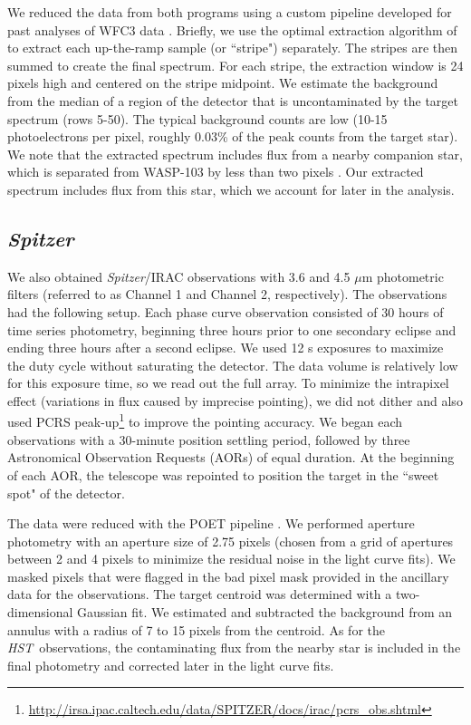 \documentclass[twocolumn]{aastex61}
\newcommand{\project}[1]{\textsl{#1}}
\newcommand{\HST}{\project{HST}}
\newcommand{\Spitzer}{\project{Spitzer}}
\begin{document}
We reduced the data from both programs using a custom pipeline developed for past analyses of WFC3 data \citep[for details see][]{kreidberg14a, kreidberg14b, kreidberg15b}. Briefly, we use the optimal extraction algorithm of \cite{horne86} to extract each up-the-ramp sample (or ``stripe") separately. The stripes are then summed to create the final spectrum. For each stripe, the extraction window is 24 pixels high and centered on the stripe midpoint. We estimate the background from the median of a region of the detector that is uncontaminated by the target spectrum (rows 5-50). The typical background counts are low (10-15 photoelectrons per pixel, roughly 0.03\% of the peak counts from the target star). We note that the extracted spectrum includes flux from a nearby companion star, which is separated from WASP-103 by less than two pixels \citep[0.2";][]{wollert15}. Our extracted spectrum includes flux from this star, which we account for later in the analysis. 

\subsection{\Spitzer}
We also obtained \Spitzer/IRAC observations with 3.6 and 4.5 $\mu$m photometric filters (referred to as Channel 1 and Channel 2, respectively). The observations had the following setup. Each phase curve observation consisted of 30 hours of time series photometry, beginning three hours prior to one secondary eclipse and ending three hours after a second eclipse.  We used 12 s exposures to maximize the duty cycle without saturating the detector. The data volume is relatively low for this exposure time, so we read out the full array. To minimize the intrapixel effect (variations in flux caused by imprecise pointing), we did not dither and also used PCRS peak-up\footnote{\url{http://irsa.ipac.caltech.edu/data/SPITZER/docs/irac/pcrs\_obs.shtml}} to improve the pointing accuracy. We began each observations with a 30-minute position settling period, followed by three Astronomical Observation Requests (AORs) of equal duration. At the beginning of each AOR, the telescope was repointed to position the target in the ``sweet spot" of the detector.

The data were reduced with the POET pipeline \citep{stevenson12}. We performed aperture photometry with an aperture size of 2.75 pixels (chosen from a grid of apertures between 2 and 4 pixels to minimize the residual noise in the light curve fits). We masked pixels that were flagged in the bad pixel mask provided in the ancillary data for the observations. The target centroid was determined with a two-dimensional Gaussian fit.  We estimated and subtracted the background from an annulus with a radius of 7 to 15 pixels from the centroid. As for the \HST\ observations, the contaminating flux from the nearby star is included in the final photometry and corrected later in the light curve fits.
\end{document}

